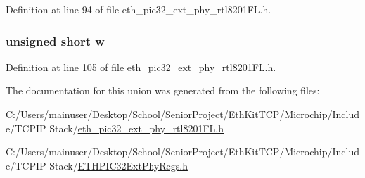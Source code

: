 Definition at line 94 of file eth\+\_\+pic32\+\_\+ext\+\_\+phy\+\_\+rtl8201\+F\+L.\+h.

\hypertarget{union_____b_m_s_t_a_tbits__t_a160850a4684a3e82c2323033964f2e98}{}
\subsubsection[{w}]{\setlength{\rightskip}{0pt plus 5cm}unsigned short w}\label{union_____b_m_s_t_a_tbits__t_a160850a4684a3e82c2323033964f2e98}


Definition at line 105 of file eth\+\_\+pic32\+\_\+ext\+\_\+phy\+\_\+rtl8201\+F\+L.\+h.



The documentation for this union was generated from the following files\+:\begin{DoxyCompactItemize}
\item 
C\+:/\+Users/mainuser/\+Desktop/\+School/\+Senior\+Project/\+Eth\+Kit\+T\+C\+P/\+Microchip/\+Include/\+T\+C\+P\+I\+P Stack/\hyperlink{eth__pic32__ext__phy__rtl8201_f_l_8h}{eth\+\_\+pic32\+\_\+ext\+\_\+phy\+\_\+rtl8201\+F\+L.\+h}\item 
C\+:/\+Users/mainuser/\+Desktop/\+School/\+Senior\+Project/\+Eth\+Kit\+T\+C\+P/\+Microchip/\+Include/\+T\+C\+P\+I\+P Stack/\hyperlink{_e_t_h_p_i_c32_ext_phy_regs_8h}{E\+T\+H\+P\+I\+C32\+Ext\+Phy\+Regs.\+h}\end{DoxyCompactItemize}
